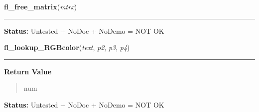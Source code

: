     \vspace{0.5ex}

\hspace{.8\funcindent}\begin{boxedminipage}{\funcwidth}

    \raggedright \textbf{fl\_free\_matrix}(\textit{mtrx})

    \vspace{-1.5ex}

    \rule{\textwidth}{0.5\fboxrule}
\setlength{\parskip}{2ex}
\setlength{\parskip}{1ex}
\textbf{Status:} Untested + NoDoc + NoDemo = NOT OK



    \end{boxedminipage}

    \label{xformslib:flflimage:fl_lookup_RGBcolor}

    \vspace{0.5ex}

\hspace{.8\funcindent}\begin{boxedminipage}{\funcwidth}

    \raggedright \textbf{fl\_lookup\_RGBcolor}(\textit{text}, \textit{p2}, \textit{p3}, \textit{p4})

    \vspace{-1.5ex}

    \rule{\textwidth}{0.5\fboxrule}
\setlength{\parskip}{2ex}
\setlength{\parskip}{1ex}
      \textbf{Return Value}
    \vspace{-1ex}

      \begin{quote}
      num

      \end{quote}

\textbf{Status:} Untested + NoDoc + NoDemo = NOT OK



    \end{boxedminipage}

    \label{xformslib:flflimage:flimage_add_format}

    \vspace{0.5ex}

